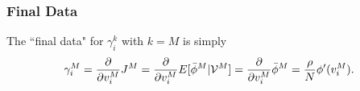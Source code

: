 \documentclass[12pt,nopreprintline]{elsarticle}
\begin{document}





\subsubsection{Final Data }%
The ``final data" for $\gamma_i^k$ with $k=M$ is simply 
\begin{equation}\label{eq:direct_adjoint_final}
\gamma_i^M =  \frac{\partial}{\partial v_i^M} J^M  = \frac{\partial}{\partial v_i^M} E[\bar{\phi}^M  |{\cal V}^M] =   \frac{\partial}{\partial v_i^M} \bar{\phi}^M = \frac{\rho}{N} \phi'(v_i^M).
\end{equation}
\end{document}
